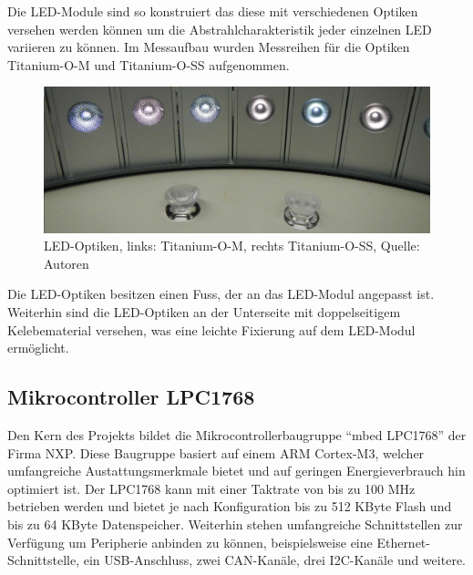 \documentclass[a4paper,12pt]{scrartcl}
\begin{document}
Die LED-Module sind so konstruiert das diese mit verschiedenen Optiken versehen werden k\"onnen um die Abstrahlcharakteristik jeder einzelnen LED variieren zu
k\"onnen. Im Messaufbau wurden Messreihen f\"ur die Optiken Titanium-O-M und Titanium-O-SS aufgenommen.
\begin{figure}[htb]
\begin{center}
  \includegraphics[width=1\hsize]{./images/foto_hardware_optiken.png}
\end{center}
\caption[LED-Optiken, links: Titanium-O-M, rechts Titanium-O-SS, Quelle:
Autoren]{\label{fotohwoptiken}LED-Optiken, links: Titanium-O-M, rechts Titanium-O-SS, Quelle:
Autoren}
\end{figure}
Die LED-Optiken besitzen einen Fuss, der an das LED-Modul angepasst ist. Weiterhin sind die LED-Optiken an der Unterseite mit doppelseitigem Kelebematerial
versehen, was eine leichte Fixierung auf dem LED-Modul ermöglicht.

\subsection{Mikrocontroller LPC1768}
Den Kern des Projekts bildet die Mikrocontrollerbaugruppe "`mbed LPC1768"' der
Firma NXP. Diese Baugruppe basiert auf einem ARM Cortex-M3, welcher umfangreiche
Austattungsmerkmale bietet und auf geringen Energieverbrauch hin optimiert ist.
Der LPC1768 kann mit einer Taktrate von bis zu 100 MHz betrieben werden und
bietet je nach Konfiguration bis zu 512 KByte Flash und bis zu 64 KByte
Datenspeicher. Weiterhin stehen umfangreiche Schnittstellen zur Verfügung um
Peripherie anbinden zu können, beispielsweise eine Ethernet-Schnittstelle, ein
USB-Anschluss, zwei CAN-Kanäle, drei I2C-Kanäle und weitere. \cite{speclpc1768}
\end{document}
